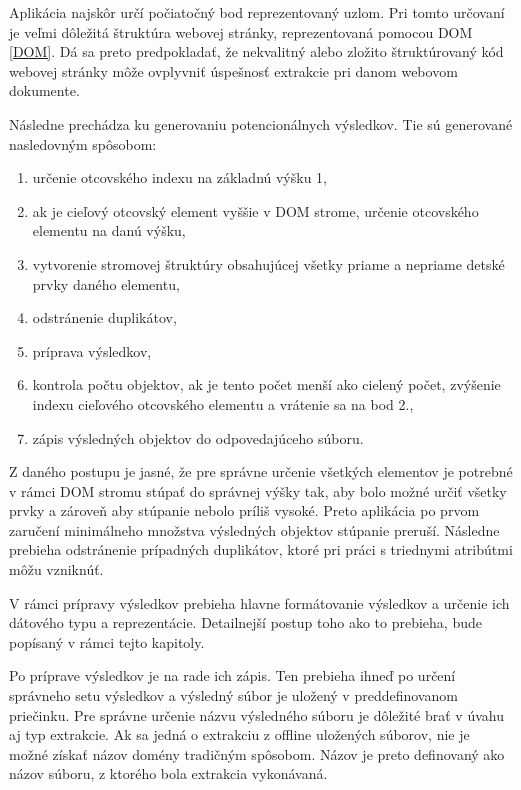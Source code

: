 Aplikácia najskôr určí počiatočný bod reprezentovaný uzlom. Pri tomto určovaní je veľmi dôležitá štruktúra webovej stránky, reprezentovaná pomocou DOM \ref{DOM}. Dá sa preto predpokladať, že nekvalitný alebo zložito štruktúrovaný kód webovej stránky môže ovplyvniť úspešnosť extrakcie pri danom webovom dokumente. 

Následne prechádza ku generovaniu potencionálnych výsledkov. Tie sú generované nasledovným spôsobom:

\bigskip

\begin{enumerate}
    \item určenie otcovského indexu na základnú výšku 1,
    \item ak je cieľový otcovský element vyššie v DOM strome, určenie otcovského elementu na danú výšku,
    \item vytvorenie stromovej štruktúry obsahujúcej všetky priame a nepriame detské prvky daného elementu,
    \item odstránenie duplikátov,
    \item príprava výsledkov,
    \item kontrola počtu objektov, ak je tento počet menší ako cielený počet, zvýšenie indexu cieľového otcovského elementu a vrátenie sa na bod 2.,
    \item zápis výsledných objektov do odpovedajúceho súboru.
\end{enumerate}

\bigskip

Z daného postupu je jasné, že pre správne určenie všetkých elementov je potrebné v rámci DOM stromu stúpať do správnej výšky tak, aby bolo možné určiť všetky prvky a zároveň aby stúpanie nebolo príliš vysoké. Preto aplikácia po prvom zaručení minimálneho množstva výsledných objektov stúpanie preruší. Následne prebieha odstránenie prípadných duplikátov, ktoré pri práci s triednymi atribútmi môžu vzniknúť.

V rámci prípravy výsledkov prebieha hlavne formátovanie výsledkov a určenie ich dátového typu a reprezentácie. Detailnejší postup toho ako to prebieha, bude popísaný v rámci tejto kapitoly. 

Po príprave výsledkov je na rade ich zápis. Ten prebieha ihneď po určení správneho setu výsledkov a výsledný súbor je uložený v preddefinovanom priečinku. Pre správne určenie názvu výsledného súboru je dôležité brať v úvahu aj typ extrakcie. Ak sa jedná o extrakciu z offline uložených súborov, nie je možné získať názov domény tradičným spôsobom. Názov je preto definovaný ako názov súboru, z ktorého bola extrakcia vykonávaná. 

